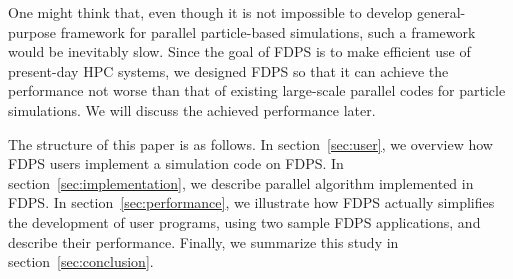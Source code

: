 One might think that, even though it is not impossible to develop
general-purpose framework for parallel particle-based simulations,
such a framework would be inevitably  slow. Since the goal of FDPS is
to make efficient use of present-day HPC systems, we designed FDPS so
that it can achieve the performance not worse than that of existing
large-scale parallel codes for particle simulations. We will discuss
the achieved performance later.

The structure of this paper is as follows. In section~\ref{sec:user},
we overview how FDPS users implement a simulation code on FDPS.  In
section~\ref{sec:implementation}, we describe parallel algorithm
implemented in FDPS. In section~\ref{sec:performance}, we illustrate
how FDPS actually simplifies the development of user programs, using
two sample FDPS applications, and describe their performance. Finally,
we summarize this study in section~\ref{sec:conclusion}.

